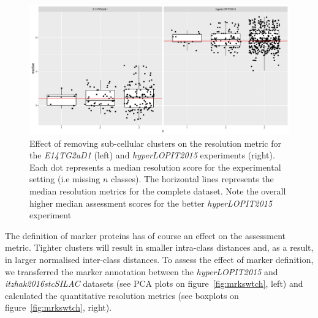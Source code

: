 \documentclass[12pt]{article}\usepackage[]{graphicx}\usepackage[]{color}
\begin{document}
\begin{figure}[h]
  \centering
  \includegraphics[width = .7\textwidth]{simn.pdf}
  \caption{Effect of removing sub-cellular clusters on the resolution
    metric for the \textit{E14TG2aD1} (left) and
    \textit{hyperLOPIT2015} experiments (right). Each dot represents a
    median resolution score for the experimental setting (i.e missing
    $n$ classes). The horizontal lines represents the median resolution
    metrics for the complete dataset. Note the overall higher median
    assessment scores for the better \textit{hyperLOPIT2015}
    experiment }
  \label{fig:simn}
\end{figure}

The definition of marker proteins has of course an effect on the
assessment metric. Tighter clusters will result in smaller intra-class
distances and, as a result, in larger normalised inter-class
distances. To assess the effect of marker definition, we transferred
the marker annotation between the \textit{hyperLOPIT2015} and
\textit{itzhak2016stcSILAC} datasets (see PCA plots on
figure~\ref{fig:mrkswtch}, left) and calculated the quantitative
resolution metrics (see boxplots on figure~\ref{fig:mrkswtch},
right).
\end{document}

